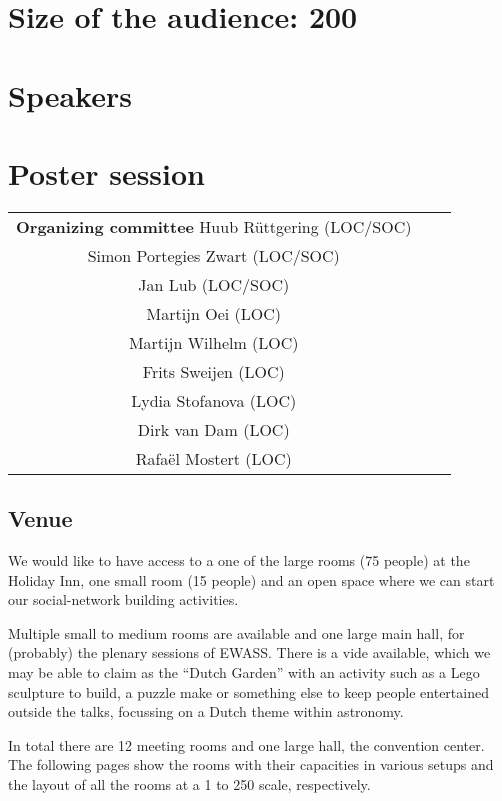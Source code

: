 \documentclass{article}
\begin{document}
\section{Size of the audience: 200}
\section{Speakers}
\section{Poster session}


\begin{center}
    \begin{tabular}{ccc}
        \textbf{Organizing committee}
        \hline
        Huub R\"uttgering (LOC/SOC)\\
        Simon Portegies Zwart (LOC/SOC)\\
        Jan Lub (LOC/SOC) \\
        Martijn Oei  (LOC) \\         
        Martijn Wilhelm (LOC) \\         
        Frits Sweijen          (LOC) \\         
        Lydia Stofanova (LOC) \\         
        Dirk van Dam  (LOC) \\         
        Rafa\"el Mostert  (LOC) \\         
    \end{tabular}
\end{center}

\subsection{Venue}

We would like to have access to a one of the large rooms (75 people)
at the Holiday Inn, one small room (15 people) and an open space where
we can start our social-network building activities.


Multiple small to medium rooms are
available and one large main hall, for (probably) the plenary sessions
of EWASS. There is a vide available, which we may be able to claim as
the ``Dutch Garden'' with an activity such as a Lego sculpture to
build, a puzzle make or something else to keep people entertained
outside the talks, focussing on a Dutch theme within astronomy.

In total there are 12 meeting rooms and one large hall, the convention
center. The following pages show the rooms with their capacities in
various setups and the layout of all the rooms at a 1 to 250 scale,
respectively.
\end{document}
